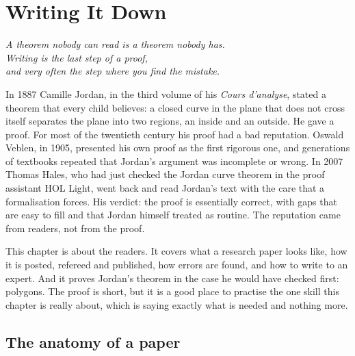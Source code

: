 \chapter{Writing It Down}
\label{ch:writing}

\begin{center}\itshape
A theorem nobody can read is a theorem nobody has.\\
Writing is the last step of a proof,\\
and very often the step where you find the mistake.
\end{center}

In 1887 Camille Jordan, in the third volume of his \emph{Cours d'analyse}, stated a theorem that every child believes: a closed curve in the plane that does not cross itself separates
the plane into two regions, an inside and an outside. He gave a proof. For most of the twentieth century his proof had a bad reputation. Oswald Veblen, in 1905, presented his own
proof as the first rigorous one, and generations of textbooks repeated that Jordan's argument was incomplete or wrong. In 2007 Thomas Hales, who had just checked the Jordan curve
theorem in the proof assistant HOL Light, went back and read Jordan's text with the care that a formalisation forces. His verdict: the proof is essentially correct, with gaps that are
easy to fill and that Jordan himself treated as routine. The reputation came from readers, not from the proof.

This chapter is about the readers. It covers what a research paper looks like, how it is posted, refereed and published, how errors are found, and how to write to an expert. And it
proves Jordan's theorem in the case he would have checked first: polygons. The proof is short, but it is a good place to practise the one skill this chapter is really about, which is saying
exactly what is needed and nothing more.

\section{The anatomy of a paper}

